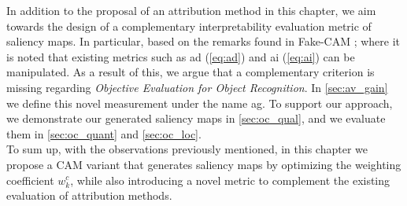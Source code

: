 \noindent In addition to the proposal of an attribution method in this chapter, we aim towards the 
design of a complementary interpretability evaluation metric of saliency maps. In particular, 
based on the remarks found in Fake-CAM \autocite{poppi2021revisiting}; where it is noted that 
existing metrics such as \gls{ad} (\ref{eq:ad}) and \gls{ai} (\ref{eq:ai}) can be manipulated. As a 
result of this, we argue that a complementary criterion is missing regarding \textit{Objective 
Evaluation for Object Recognition}. In \autoref{sec:av_gain} we define this novel measurement 
under the name \gls{ag}. To support our approach, we demonstrate our generated saliency maps in 
\autoref{sec:oc_qual}, and we evaluate them in \autoref{sec:oc_quant} and \autoref{sec:oc_loc}.\\

\noindent To sum up, with the observations previously mentioned, in this chapter we propose a CAM 
variant that generates saliency maps by optimizing the weighting coefficient $w_k^c$, while also 
introducing a novel metric to complement the existing evaluation of attribution methods.\\











